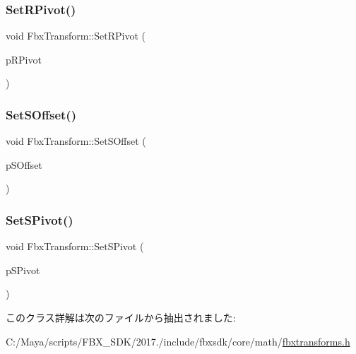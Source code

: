 \mbox{\label{class_fbx_transform_a0c4646271d2b4205288c6dc2200fc57b}} 
\subsubsection{\texorpdfstring{Set\+R\+Pivot()}{SetRPivot()}}
{\footnotesize\ttfamily void Fbx\+Transform\+::\+Set\+R\+Pivot (\begin{DoxyParamCaption}\item[{const \hyperlink{class_fbx_vector4}{Fbx\+Vector4} \&}]{p\+R\+Pivot }\end{DoxyParamCaption})}

\mbox{\label{class_fbx_transform_a62c43ef5f9f11e06b88649ed0dd3b4b5}} 
\subsubsection{\texorpdfstring{Set\+S\+Offset()}{SetSOffset()}}
{\footnotesize\ttfamily void Fbx\+Transform\+::\+Set\+S\+Offset (\begin{DoxyParamCaption}\item[{const \hyperlink{class_fbx_vector4}{Fbx\+Vector4} \&}]{p\+S\+Offset }\end{DoxyParamCaption})}

\mbox{\label{class_fbx_transform_a7a7084f9afd2f102f8db147e4b1c1583}} 
\subsubsection{\texorpdfstring{Set\+S\+Pivot()}{SetSPivot()}}
{\footnotesize\ttfamily void Fbx\+Transform\+::\+Set\+S\+Pivot (\begin{DoxyParamCaption}\item[{const \hyperlink{class_fbx_vector4}{Fbx\+Vector4} \&}]{p\+S\+Pivot }\end{DoxyParamCaption})}



このクラス詳解は次のファイルから抽出されました\+:\begin{DoxyCompactItemize}
\item 
C\+:/\+Maya/scripts/\+F\+B\+X\+\_\+\+S\+D\+K/2017./include/fbxsdk/core/math/\hyperlink{fbxtransforms_8h}{fbxtransforms.\+h}\end{DoxyCompactItemize}
